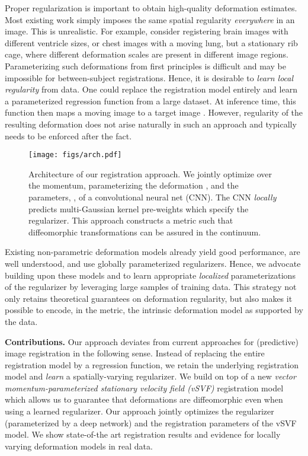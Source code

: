 \documentclass[10pt,twocolumn,letterpaper,table]{article}
\numberwithin{equation}{section}
\theoremstyle{plain}
\theoremstyle{definition}
\begin{document}
Proper regularization is important to obtain high-quality deformation estimates. Most existing work simply imposes the same spatial regularity \emph{everywhere} in an image. This is unrealistic. For example, consider registering brain images with different ventricle sizes, or chest images with a moving lung, but a stationary rib cage, where different deformation scales are present in different image regions. Parameterizing such deformations from first principles is difficult and may be impossible for between-subject registrations. Hence, it is desirable to {\it learn local regularity} from data. One could replace the registration model entirely and learn a parameterized regression function  from a large dataset. At inference time, this function then maps a moving image to a target image \cite{de2017end}. However, regularity of the resulting deformation does not arise naturally in such an approach and typically needs to be enforced after the fact.

\begin{figure}[t!]
  \centering
    \texttt{[image: figs/arch.pdf]}
              \caption{Architecture of our registration approach. We jointly optimize over the momentum, parameterizing the deformation , and the parameters, , of a convolutional neural net (CNN). The CNN {\it locally} predicts multi-Gaussian kernel pre-weights which specify the regularizer. This approach constructs a metric such that diffeomorphic transformations can be assured in the continuum.} 
    \label{fig:overview}
    \vspace{-0.2cm}
\end{figure}


Existing non-parametric deformation models already yield good performance, are well understood, and use globally parameterized regularizers. Hence, we advocate building upon these models and to learn appropriate \emph{localized} parameterizations of the regularizer by leveraging large samples of training data. This strategy not only retains theoretical guarantees on deformation regularity, but also makes it possible to encode, in the metric, the intrinsic deformation model as supported by the data.



\noindent
    {\bf Contributions.} Our approach deviates from current approaches for (predictive) image registration in the following sense. Instead of replacing the entire registration model by a regression function, we retain the underlying registration model and \emph{learn} a spatially-varying regularizer. We build on top of a new \emph{vector momentum-parameterized stationary velocity field (vSVF)} registration model which allows us to guarantee that deformations are diffeomorphic even when using a learned regularizer. Our approach jointly optimizes the regularizer (parameterized by a deep network) and the registration parameters of the vSVF model. We show state-of-the art registration results and evidence for locally varying deformation models in real data.
\end{document}
